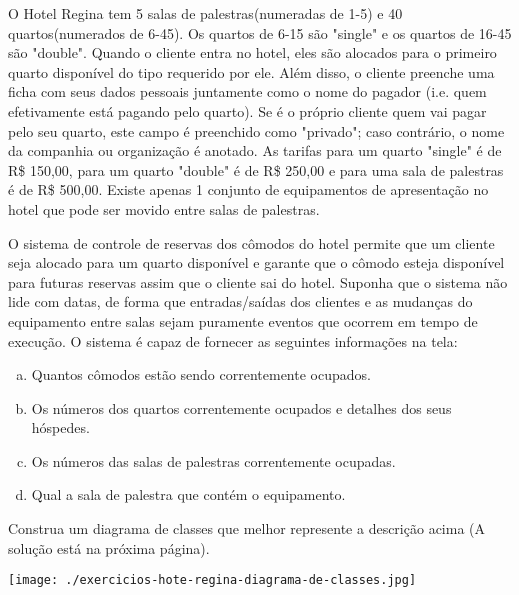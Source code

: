 \documentclass[12pt]{exam}
\begin{document}
    O Hotel Regina tem 5 salas de palestras(numeradas de 1-5) e 40 quartos(numerados de 6-45). Os quartos de 6-15 são "single" e os quartos de 16-45 
    são "double". Quando o cliente entra no hotel, eles são alocados para o primeiro quarto disponível do tipo requerido por ele. Além disso, o cliente 
    preenche uma ficha com seus dados pessoais juntamente como o nome do pagador (i.e. quem efetivamente está pagando pelo quarto). Se é o próprio cliente
    quem vai pagar pelo seu quarto, este campo é preenchido como "privado"; caso contrário, o nome da companhia ou organização é anotado. As tarifas para um
    quarto "single" é de R\$ 150,00, para um quarto "double" é de R\$ 250,00 e para uma sala de palestras é de R\$ 500,00. Existe apenas 1 conjunto de equipamentos
    de apresentação no hotel que pode ser movido entre salas de palestras.
    
    O sistema de controle de reservas dos cômodos do hotel permite que um cliente seja alocado para um quarto disponível e garante que o cômodo esteja disponível
    para futuras reservas assim que o cliente sai do hotel. Suponha que o sistema não lide com datas, de forma que entradas/saídas dos clientes e as mudanças do 
    equipamento entre salas sejam puramente eventos que ocorrem em tempo de execução. O sistema é capaz de fornecer as seguintes informações na tela:
    
    \begin{enumerate}[(a)]
     \item Quantos cômodos estão sendo correntemente ocupados.
     \item Os números dos quartos correntemente ocupados e detalhes dos seus hóspedes.
     \item Os números das salas de palestras correntemente ocupadas.
     \item Qual a sala de palestra que contém o equipamento.
    \end{enumerate}

  \begin{questions}
	\question Construa um diagrama de classes que melhor represente a descrição acima (A solução está na próxima página).
	\begin{solution}
	   \texttt{[image: ./exercicios-hote-regina-diagrama-de-classes.jpg]}
	\end{solution}

  \end{questions}
\end{document}

